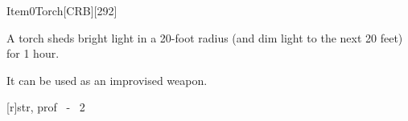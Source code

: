 
\begin{card}{Item}{0}{Torch}[CRB][292]

A torch sheds bright light in a 20-foot radius (and dim light to the next 20 feet) for 1 hour. 

It can be used as an improvised weapon.

[r]{str, prof ~-~ 2} %
{}

\vfill

\end{card}

